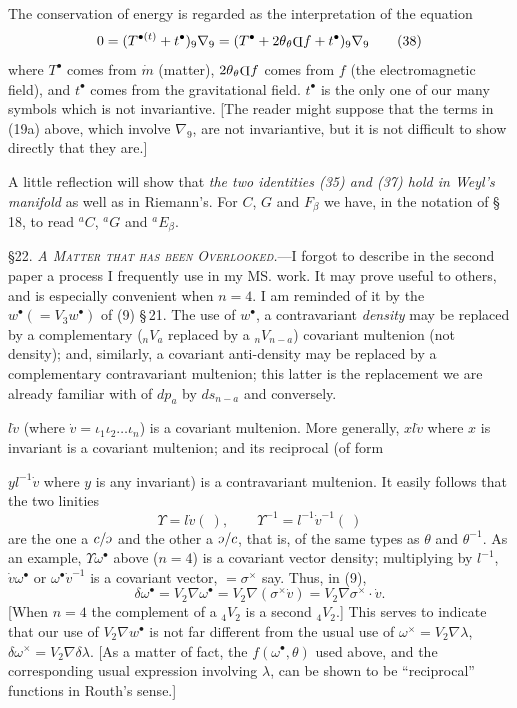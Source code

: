 \documentclass[11pt]{article}
\newcommand{\invc}{\mathord{\rotatebox[origin=c]{180}{$c$}}}
\newcommand{\invc}{\mathord{\text{\invcfont ɔ}}}
\newcommand{\invd}{\mathord{\vcenter{\hbox{\rotatebox[origin=c]{180}{\(\mathrm{D}\)}}}}}
\newcommand{\thetaPi}{{}_\theta\invd}
\begin{document}
\indent The conservation of energy is regarded as the interpretation of the equation
\[
  0=(T^{\bullet(t)}+t^\bullet)_9\nabla_9=(T^\bullet+2\theta\thetaPi f+t^\bullet)_9\nabla_9
  \tag{38}
\]
where $T^\bullet$ comes from $\dot m$ (matter), $2\theta\thetaPi f$ comes from $f$ (the electromagnetic field), and $t^\bullet$ comes from the gravitational field. $t^\bullet$ is the only one of our many symbols which is not invariantive. [The reader might suppose that the terms in (19a) above, which involve $\nabla_9$, are not invariantive, but it is not difficult to show directly that they are.]

\indent A little reflection will show that \emph{the two identities (35) and (37) hold in Weyl's manifold} as well as in Riemann's. For $C$, $G$ and $F_\beta$ we have, in the notation of \S\,18, to read ${}^aC$, ${}^aG$ and ${}^aE_\beta$.

\indent \textsc{\S 22. \emph{A Matter that has been Overlooked.}}---I forgot to describe in the second paper a process I frequently use in my MS. work. It may prove useful to others, and is especially convenient when $n=4$. I am reminded of it by the $w^\bullet(=V_3w^\bullet)$ of (9) \S\,21. The use of $w^\bullet$, a contravariant \emph{density} may be replaced by a complementary (${}_nV_a$ replaced by a ${}_nV_{n-a}$) covariant multenion (not density); and, similarly, a covariant anti-density may be replaced by a complementary contravariant multenion; this latter is the replacement we are already familiar with of $d p_a$ by $d s_{n-a}$ and conversely.

\indent $l\dot v$ (where $\dot v=\iota_1\iota_2\ldots\iota_n$) is a covariant multenion. More generally, $xl\dot v$ where $x$ is invariant is a covariant multenion; and its reciprocal (of form

$yl^{-1}\dot v$ where $y$ is any invariant) is a contravariant multenion. It easily follows that the two linities
\[
  \Upsilon=l\dot v(\ ),\qquad \Upsilon^{-1}=l^{-1}\dot v^{-1}(\ )
  \tag{1}
\]
are the one a $c/\invc$ and the other a $\invc/c$, that is, of the same types as $\theta$ and $\theta^{-1}$. As an example, $\Upsilon\omega^\bullet$ above ($n=4$) is a covariant vector density; multiplying by $l^{-1}$, $\dot v\omega^\bullet$ or $\omega^\bullet\dot v^{-1}$ is a covariant vector, $=\sigma^\times$ say. Thus, in (9),
\[
  \delta\omega^\bullet=V_2\nabla\omega^\bullet=V_2\nabla(\sigma^\times\dot v)=V_2\nabla\sigma^\times\mathbin{\cdot}\dot v.
\]
[When $n=4$ the complement of a ${}_4V_2$ is a second ${}_4V_2$.] This serves to indicate that our use of $V_2\nabla w^\bullet$ is not far different from the usual use of $\omega^\times=V_2\nabla\lambda$, $\delta\omega^\times=V_2\nabla\delta\lambda$. [As a matter of fact, the $f(\omega^\bullet,\theta)$ used above, and the corresponding usual expression involving $\lambda$, can be shown to be ``reciprocal'' functions in Routh's sense.]
\end{document}
